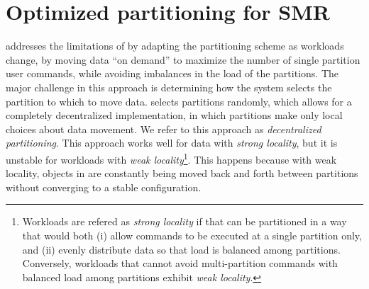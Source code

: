 \chapter[Optimized partitioning for SMR]{Optimized partitioning for SMR}
\label{sec:dynastar}


\dssmr{} addresses the limitations of \ssmr{} by adapting the partitioning
scheme as workloads change, by moving data ``on demand'' to maximize the number
of single partition user commands, while avoiding imbalances in the load of the
partitions. The major challenge in this approach is determining how the system
selects the partition to which to move data. \dssmr{} selects partitions
randomly, which allows for a completely decentralized implementation, in which
partitions make only local choices about data movement. We refer to this
approach as \emph{decentralized partitioning}. This approach works well for data
with \emph{strong locality}, but it is unstable for workloads with \emph{weak
locality}\footnote{Workloads are refered as \emph{strong locality} if that can
be partitioned in a way that would both (i) allow commands to be executed at a
single partition only, and (ii) evenly distribute data so that load is balanced
among partitions. Conversely, workloads that cannot avoid multi-partition
commands with balanced load among partitions exhibit \emph{weak locality}.}.
This happens because with weak locality, objects in \dssmr{} are constantly
being moved back and forth between partitions without converging to a stable
configuration.


